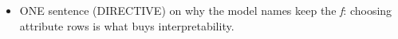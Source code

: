 \begin{itemize}
    \item ONE sentence (DIRECTIVE) on why the model names keep the \emph{f}: choosing attribute rows is what buys interpretability. 

\end{itemize}
